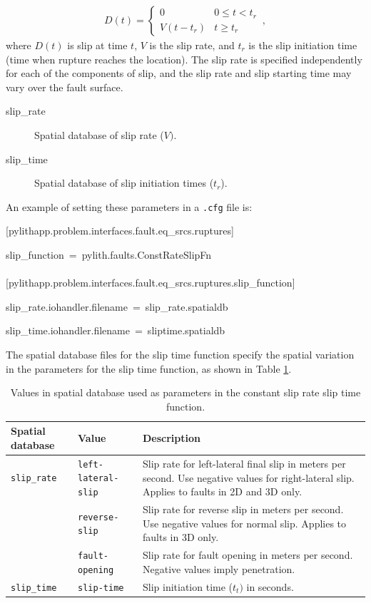 \begin{gather}
D(t)=\left\{ \begin{array}{cc}
0 & 0\leq t<t_{r}\\
V(t-t_{r}) & t\ge t_{r}
\end{array}\right.\,,
\end{gather}
where $D(t)$ is slip at time $t$, $V$ is the slip rate, and $t_{r}$
is the slip initiation time (time when rupture reaches the location).
The slip rate is specified independently for each of the components
of slip, and the slip rate and slip starting time may vary over the
fault surface.
\begin{description}
\item [{slip\_rate}] Spatial database of slip rate ($V)$.
\item [{slip\_time}] Spatial database of slip initiation times ($t_{r}$).
\end{description}
An example of setting these parameters in a \texttt{.cfg} file is:
\begin{lyxcode}
{[}pylithapp.problem.interfaces.fault.eq\_srcs.ruptures{]}

slip\_function~=~pylith.faults.ConstRateSlipFn~\\
~\\
{[}pylithapp.problem.interfaces.fault.eq\_srcs.ruptures.slip\_function{]}

slip\_rate.iohandler.filename~=~slip\_rate.spatialdb

slip\_time.iohandler.filename~=~sliptime.spatialdb
\end{lyxcode}
The spatial database files for the slip time function specify the
spatial variation in the parameters for the slip time function, as
shown in Table \ref{tab:const-slip-rate-db-params}.

\noindent \begin{center}
\begin{table}[H]
\noindent \centering{}\caption{\label{tab:const-slip-rate-db-params}Values in spatial database used
as parameters in the constant slip rate slip time function.}
\medskip{}
\begin{tabular}{|l|l|>{\raggedright}p{2.5in}|}
\hline 
\textbf{Spatial database} & \textbf{Value} & \textbf{Description}\tabularnewline
\hline 
\hline 
\texttt{slip\_rate} & \texttt{left-lateral-slip} & Slip rate for left-lateral final slip in meters per second. Use negative
values for right-lateral slip. Applies to faults in 2D and 3D only.\tabularnewline
 & \texttt{reverse-slip} & Slip rate for reverse slip in meters per second. Use negative values
for normal slip. Applies to faults in 3D only.\tabularnewline
 & \texttt{fault-opening} & Slip rate for fault opening in meters per second. Negative values
imply penetration.\tabularnewline
\hline 
\texttt{slip\_time} & \texttt{slip-time} & Slip initiation time ($t_{t})$ in seconds.\tabularnewline
\hline 
\end{tabular}
\end{table}

\par\end{center}


